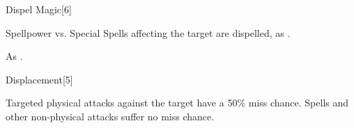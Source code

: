 \begin{spellsection}[Greater]{Dispel Magic}[6]
    \begin{spellheader}
    \end{spellheader}
    \begin{spellcontent}
        \begin{spelltargetinginfo}
        \end{spelltargetinginfo}
        \begin{spelleffects}
            \begin{spellattack}{Spellpower vs. Special}
                \spelleffect Spells affecting the target are dispelled, as .
            \end{spellattack}
        \end{spelleffects}
    \end{spellcontent}
    \begin{spellfooter}
        \spellnotes As .
        \miscastyou
    \end{spellfooter}
\end{spellsection}

\begin{spellsection}{Displacement}[5]
    \begin{spellheader}
    \end{spellheader}
    \begin{spellcontent}
        \begin{spelltargetinginfo}
        \end{spelltargetinginfo}
        \begin{spelleffects}
            \spelleffect Targeted physical attacks against the target have a 50\% miss chance. Spells and other non-physical attacks suffer no miss chance.
            \spelldur \durshort \dismissable
        \end{spelleffects}
    \end{spellcontent}
    \begin{spellfooter}
        \miscastrandom
    \end{spellfooter}
\end{spellsection}

